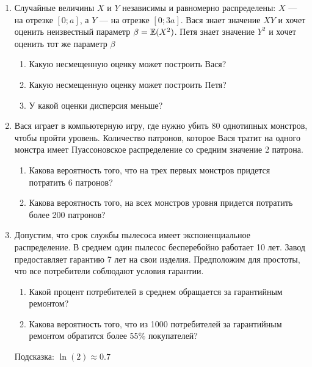 \begin{enumerate}

\item Случайные величины $X$ и $Y$ независимы и равномерно распределены: $X$ —
на отрезке $[0;a]$, а $Y$ — на отрезке $[0;3a]$.
Вася знает значение $XY$ и хочет оценить неизвестный параметр $\beta=\operatorname{\mathbb{E}}(X^{2})$.
Петя знает значение $Y^2$ и хочет оценить тот же параметр $\beta$
\begin{enumerate}
\item Какую несмещенную оценку может построить Вася?
\item Какую несмещенную оценку может построить Петя?
\item У какой оценки дисперсия меньше?
\end{enumerate}


\item Вася играет в компьютерную игру, где нужно убить 80 однотипных монстров,
чтобы пройти уровень. Количество патронов, которое Вася тратит на одного монстра
имеет Пуассоновское распределение со средним значение 2 патрона.
\begin{enumerate}
\item Какова вероятность того, что на трех первых монстров придется потратить 6 патронов?
\item Какова вероятность того, на всех монстров уровня придется потратить более 200 патронов?
\end{enumerate}

\item Допустим, что срок службы пылесоса имеет экспоненциальное распределение.
В среднем один пылесос бесперебойно работает 10 лет. Завод предоставляет гарантию
7 лет на свои изделия. Предположим для простоты, что все потребители соблюдают
условия гарантии.
\begin{enumerate}
\item Какой процент потребителей в среднем обращается за гарантийным ремонтом?
\item Какова вероятность того, что из 1000 потребителей за гарантийным ремонтом
обратится более 55\% покупателей?
\end{enumerate}
Подсказка: $\ln(2)\approx 0.7$


\end{enumerate}
